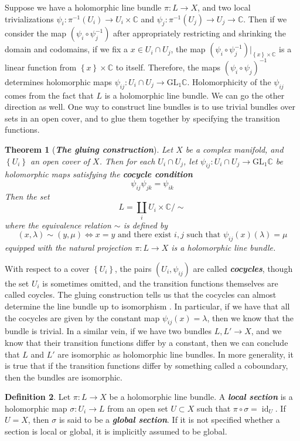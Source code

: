 \documentclass[psamsfonts, 12pt]{amsart}
\newtheorem{thm}{Theorem}[section]
\theoremstyle{definition}
\newtheorem{defn}[thm]{Definition}
\theoremstyle{remark}
\newcommand{\ib}[1]{\textbf{\textit{#1}}}
\newcommand{\C}{\mathbb{C}}
\newcommand{\GL}{\mathrm{GL}}
\newcommand{\inv}{^{-1}}
\newcommand{\set}[1]{\left\lbrace #1 \right\rbrace}
\DeclareMathOperator{\id}{id}
\begin{document}
Suppose we have a holomorphic line bundle $\pi : L \to X$, and two local trivializations
$\psi_i : \pi\inv(U_i) \to U_i \times \C$ and $\psi_j : \pi\inv(U_j) \to U_j \to \C$.
Then if we consider the map $(\psi_i \circ \psi_j\inv)$ after appropriately restricting
and shrinking the domain and codomains, if we fix a $x \in U_i \cap U_j$,
the map $(\psi_i \circ \psi_j\inv)\vert_{\set{x} \times \C}$ is a linear function
from $\set{x} \times \C$ to itself. Therefore, the maps $(\psi_i \circ \psi_j)\inv$
determines holomorphic maps $\psi_{ij} : U_i \cap U_j \to \GL_1\C$. Holomorphicity of the
$\psi_{ij}$ comes from the fact that $L$ is a holomorphic line bundle. We can go the
other direction as well. One way to construct line bundles is to use trivial bundles over
sets in an open cover, and to glue them together by specifying the transition functions.
%
\begin{thm}[\ib{The gluing construction}]
Let $X$ be a complex manifold, and $\set{U_i}$ an open cover of $X$. Then
for each $U_i  \cap U_j$, let $\psi_{ij} : U_i\cap U_j \to \GL_1\C$ be holomorphic
maps satisfying the \ib{cocycle condition}
\[
\psi_{ij}\psi_{jk} = \psi_{ik}
\]
Then the set
\[
L = \coprod_{i} U_i \times \C/\sim
\]
where the equivalence relation $\sim$ is defined by
\[
(x,\lambda) \sim (y,\mu) \iff x=y \text{ and there exist } i,j \text{ such that }
\psi_{ij}(x)(\lambda) = \mu
\]
equipped with the natural projection $\pi : L \to X$ is a holomorphic line bundle.
\end{thm}
%
With respect to a cover $\set{U_i}$, the pairs $(U_i, \psi_{ij})$ are called
\ib{cocycles}, though the set $U_i$ is sometimes omitted, and the transition
functions themselves are called coycles. The gluing construction tells us
that the cocycles can almost determine the line bundle up to isomorphism . In
particular, if we have that all the cocycles are given by the constant map
$\psi_{ij}(x) = \lambda$, then we know that the bundle is trivial. In a similar
vein, if we have two bundles $L,L' \to X$, and we know that their transition
functions differ by a constant, then we can conclude that $L$ and $L'$ are
isomorphic as holomorphic line bundles. In more generality, it is true that
if the transition functions differ by something called a coboundary, then the
bundles are isomorphic.
%
\begin{defn}
Let $\pi : L \to X$ be a holomorphic line bundle. A \ib{local section} is
a holomorphic map $\sigma : U_i \to L$  from an open set $U \subset X$ such that
$\pi \circ \sigma = \id_U$. If $U = X$, then $\sigma$ is said to be a
\ib{global section}. If it is not specified whether a section is local
or global, it is implicitly assumed to be global.
\end{defn}
\end{document}
